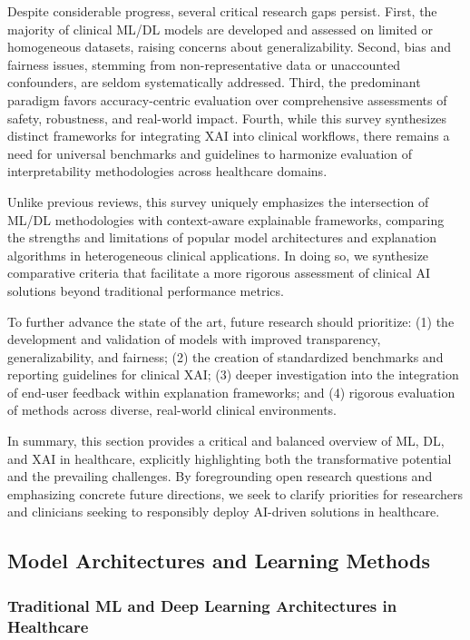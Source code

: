 \documentclass[sigconf]{acmart}
\begin{document}
Despite considerable progress, several critical research gaps persist. First, the majority of clinical ML/DL models are developed and assessed on limited or homogeneous datasets, raising concerns about generalizability. Second, bias and fairness issues, stemming from non-representative data or unaccounted confounders, are seldom systematically addressed. Third, the predominant paradigm favors accuracy-centric evaluation over comprehensive assessments of safety, robustness, and real-world impact. Fourth, while this survey synthesizes distinct frameworks for integrating XAI into clinical workflows, there remains a need for universal benchmarks and guidelines to harmonize evaluation of interpretability methodologies across healthcare domains.

Unlike previous reviews, this survey uniquely emphasizes the intersection of ML/DL methodologies with context-aware explainable frameworks, comparing the strengths and limitations of popular model architectures and explanation algorithms in heterogeneous clinical applications. In doing so, we synthesize comparative criteria that facilitate a more rigorous assessment of clinical AI solutions beyond traditional performance metrics.

To further advance the state of the art, future research should prioritize: (1) the development and validation of models with improved transparency, generalizability, and fairness; (2) the creation of standardized benchmarks and reporting guidelines for clinical XAI; (3) deeper investigation into the integration of end-user feedback within explanation frameworks; and (4) rigorous evaluation of methods across diverse, real-world clinical environments.

In summary, this section provides a critical and balanced overview of ML, DL, and XAI in healthcare, explicitly highlighting both the transformative potential and the prevailing challenges. By foregrounding open research questions and emphasizing concrete future directions, we seek to clarify priorities for researchers and clinicians seeking to responsibly deploy AI-driven solutions in healthcare.

\subsection{Model Architectures and Learning Methods}

\subsubsection{Traditional ML and Deep Learning Architectures in Healthcare}
\end{document}
